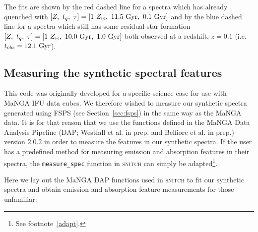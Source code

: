 \documentclass[useAMS,usenatbib]{mn2e}
\begin{document}
 The fits are shown by the red dashed line for a spectra which has already quenched with $[Z,~t_q,~\tau] = [1~Z_{\odot},~11.5~\rm{Gyr},~0.1~\rm{Gyr}]$ and by the blue dashed line for a spectra which still has some residual star formation $[Z,~t_q,~\tau] = [1~Z_{\odot},~10.0~\rm{Gyr},~1.0~\rm{Gyr}]$ both observed at a redshift, $z=0.1$ (i.e. $t_{obs}=12.1~\rm{Gyr}$). 


\subsection{Measuring the synthetic spectral features}\label{sec:dap}

This code was originally developed for a specific science case for use with MaNGA IFU data cubes. We therefore wished to measure our synthetic spectra generated using FSPS (see Section~\ref{sec:fsps}) in the same way as the MaNGA data. It is for that reason that we use the functions defined in the MaNGA Data Analysis Pipeline (DAP; Westfall et al. in prep. and Belfiore et al. in prep.) version $2.0.2$ in order to measure the features in our synthetic spectra. If the user has a predefined method for measuring emission and absorption features in their spectra, the \texttt{measure\_spec} function in \textsc{snitch} can simply be adapted\footnote{See footnote~\ref{adapt}.}.

Here we lay out the MaNGA DAP functions used in \textsc{snitch} to fit our synthetic spectra and obtain emission and absorption feature measurements for those unfamiliar:
\end{document}
